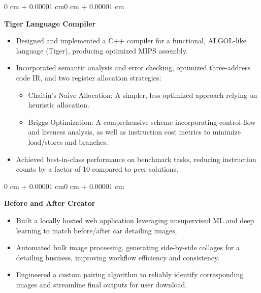 \documentclass[10pt, letterpaper]{article}
\newenvironment{highlights}{
    \begin{itemize}[
        topsep=0.10 cm,
        parsep=0.10 cm,
        partopsep=0pt,
        itemsep=0pt,
        leftmargin=0.4 cm + 10pt
    ]
}{
    \end{itemize}
}
\newenvironment{onecolentry}{
    \begin{adjustwidth}{0 cm + 0.00001 cm}{0 cm + 0.00001 cm}
}{
    \end{adjustwidth}
}
\begin{document}
\vspace{0.4 cm}

\begin{onecolentry}
    \textbf{Tiger Language Compiler}
    \begin{highlights}
        \item Designed and implemented a C++ compiler for a functional, ALGOL-like language (Tiger), producing optimized MIPS assembly.
        \item Incorporated semantic analysis and error checking, optimized three-address code IR, and two register allocation strategies:
        \begin{itemize}
            \item Chaitin’s Naive Allocation: A simpler, less optimized approach relying on heuristic allocation.
            \item Briggs Optimization: A comprehensive scheme incorporating control-flow and liveness analysis, as well as instruction cost metrics to minimize load/stores and branches.
        \end{itemize}
        \item Achieved best-in-class performance on benchmark tasks, reducing instruction counts by a factor of 10 compared to peer solutions.
    \end{highlights}
\end{onecolentry}

\vspace{0.4 cm}

\begin{onecolentry}
    \textbf{Before and After Creator}
    \begin{highlights}
        \item Built a locally hosted web application leveraging unsupervised ML and deep learning to match before/after car detailing images.
        \item Automated bulk image processing, generating side-by-side collages for a detailing business, improving workflow efficiency and consistency.
        \item Engineered a custom pairing algorithm to reliably identify corresponding images and streamline final outputs for user download.
    \end{highlights}
\end{onecolentry}
\end{document}
